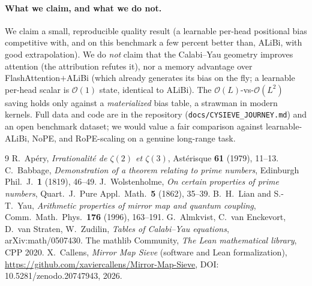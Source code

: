 \documentclass[11pt,a4paper]{article}
\theoremstyle{definition}
\theoremstyle{remark}
\begin{document}
\paragraph{What we claim, and what we do not.} We claim a small, reproducible
quality result (a learnable per-head positional bias competitive with, and on
this benchmark a few percent better than, ALiBi, with good extrapolation). We do
\emph{not} claim that the Calabi--Yau geometry improves attention (the
attribution refutes it), nor a memory advantage over FlashAttention$+$ALiBi
(which already generates its bias on the fly; a learnable per-head scalar is
$\mathcal{O}(1)$ state, identical to ALiBi). The $\mathcal{O}(L)$-vs-$\mathcal
{O}(L^2)$ saving holds only against a \emph{materialized} bias table, a strawman
in modern kernels. Full data and code are in the repository
(\texttt{docs/CYSIEVE\_JOURNEY.md}) and an open benchmark dataset; we would value
a fair comparison against learnable-ALiBi, NoPE, and RoPE-scaling on a genuine
long-range task.

\begin{thebibliography}{9}
 R.~Ap\'ery, \emph{Irrationalit\'e de $\zeta(2)$ et
  $\zeta(3)$}, Ast\'erisque \textbf{61} (1979), 11--13.
 C.~Babbage, \emph{Demonstration of a theorem relating to
  prime numbers}, Edinburgh Phil.\ J.\ \textbf{1} (1819), 46--49.
 J.~Wolstenholme, \emph{On certain properties of prime
  numbers}, Quart.\ J.\ Pure Appl.\ Math.\ \textbf{5} (1862), 35--39.
 B.~H.~Lian and S.-T.~Yau, \emph{Arithmetic properties of
  mirror map and quantum coupling}, Comm.\ Math.\ Phys.\ \textbf{176} (1996),
  163--191.
 G.~Almkvist, C.~van Enckevort, D.~van Straten,
  W.~Zudilin, \emph{Tables of Calabi--Yau equations}, arXiv:math/0507430.
 The mathlib Community, \emph{The Lean mathematical library},
  CPP 2020.
 X.~Callens, \emph{Mirror Map Sieve} (software and Lean
  formalization), \url{https://github.com/xaviercallens/Mirror-Map-Sieve},
  DOI:\,10.5281/zenodo.20747943, 2026.
\end{thebibliography}
\end{document}
